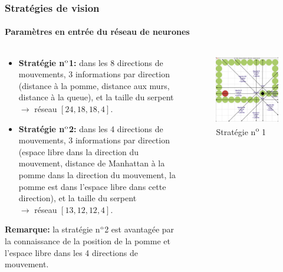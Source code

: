\documentclass[10pt]{beamer}
\begin{document}
\begin{frame}
\frametitle{Stratégies de vision}
\framesubtitle{Paramètres en entrée du réseau de neurones}
\begin{columns}[T]
\begin{column}{0.60\textwidth}
\footnotesize
\begin{itemize}
\footnotesize
\item \textbf{Stratégie n$\textsuperscript{o}$1:} dans les 8 directions de mouvements, 3 informations par direction (distance à la pomme, distance aux murs, distance à la queue), et la taille du serpent\\
$\rightarrow$ réseau $\left[24, 18, 18, 4\right]$.
\item \textbf{Stratégie n$\textsuperscript{o}$2:} dans les 4 directions de mouvements, 3 informations par direction (espace libre dans la direction du mouvement, distance de Manhattan à la pomme dans la direction du mouvement, la pomme est dans l'espace libre dans cette direction), et la taille du serpent\\
$\rightarrow$ réseau $\left[13, 12, 12, 4\right]$.
\end{itemize}

\vspace{0.3cm}
\textbf{Remarque:} la stratégie n$\textsuperscript{o}$2 est avantagée par la connaissance de la position de la pomme et l'espace libre dans les 4 directions de mouvement.
\end{column}
\begin{column}{0.40\textwidth}

\begin{figure}
\vspace{-1.2cm}
\includegraphics[width=1\textwidth]{snake_vision_illustration2.png}
\vspace{-0.7cm}
\caption*{\tiny Stratégie n\textsuperscript{o} 1}
\end{figure}


\end{column}
\end{columns}
\end{frame}
\end{document}
